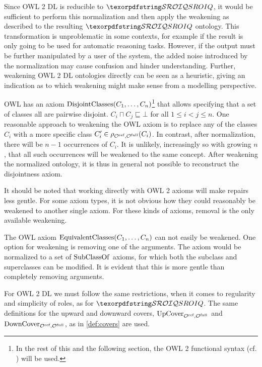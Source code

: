 Since OWL 2 DL is reducible to $\SROIQ$, it would be sufficient to perform this normalization and then apply the weakening as described to the resulting $\SROIQ$ ontology. This transformation is unproblematic in some contexts, for example if the result is only going to be used for automatic reasoning tasks. However, if the output must be further manipulated by a user of the system, the added noise introduced by the normalization may cause confusion and hinder understanding. Further, weakening OWL 2 DL ontologies directly can be seen as a heuristic, giving an indication as to which weakening might make sense from a modelling perspective.

\begin{example}
  OWL has an axiom $\operatorname{DisjointClasses}(C_1, \dots, C_n)$\footnote{In the rest of this and the following section, the OWL 2 functional syntax (cf. \cite{motik2012ontology}) will be used.} that allows specifying that a set of classes all are pairwise disjoint. $C_i \sqcap C_j \sqsubseteq \bot$ for all $1 \leq i < j \leq n$. One reasonable approach to weakening the OWL axiom is to replace any of the classes $C_i$ with a more specific class $C_i' \in \rho_{{\mathcal{O}^\textnormal{ref}},{\mathcal{O}^\textnormal{full}}}(C_i)$. In contrast, after normalization, there will be $n - 1$ occurrences of $C_i$. It is unlikely, increasingly so with growing $n$, that all such occurrences will be weakened to the same concept. After weakening the normalized ontology, it is thus in general not possible to reconstruct the disjointness axiom.
\end{example}

It should be noted that working directly with OWL 2 axioms will make repairs less gentle. For some axiom types, it is not obvious how they could reasonably be weakened to another single axiom. For these kinds of axioms, removal is the only available weakening.

\begin{example}
  The OWL axiom $\operatorname{EquivalentClasses}(C_1, \dots, C_n)$ can not easily be weakened. One option for weakening is removing one of the arguments. The axiom would be normalized to a set of $\operatorname{SubClassOf}$ axioms, for which both the subclass and superclasses can be modified. It is evident that this is more gentle than completely removing arguments.
\end{example}

For OWL 2 DL we must follow the same restrictions, when it comes to regularity and simplicity of roles, as for $\SROIQ$. The same definitions for the upward and downward covers, ${\operatorname{UpCover}}_{{\mathcal{O}^\textnormal{ref}},{\mathcal{O}^\textnormal{full}}}$ and ${\operatorname{DownCover}}_{{\mathcal{O}^\textnormal{ref}},{\mathcal{O}^\textnormal{full}}}$, as in \cref{def:covers} are used.

